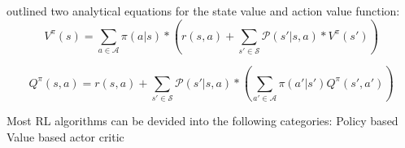 \documentclass{../main.tex}{subfiles}
\begin{document}
\cite{Bellman1957} outlined two analytical equations for the state value and action value function:
\begin{equation}\label{equation:bellman:state-value-function}
V^{\pi}(s) = \sum_{a \in \mathcal{A}} \pi(a | s) * (r(s, a) + \sum_{s' \in \mathcal{S}} \mathcal{P}(s' | s, a) * V^{\pi}(s'))
\end{equation}

\begin{equation}\label{equation:bellman:action-value-function}
Q^{\pi}(s, a) = r(s, a) + \sum_{s' \in \mathcal{S}} \mathcal{P}(s' | s, a) * (\sum_{a' \in \mathcal{A}} \pi(a' | s') Q^{\pi}(s', a'))
\end{equation}


Most RL algorithms can be devided into the following categories:
Policy based
Value based
actor critic
\end{document}

